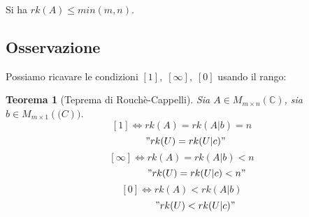 \documentclass[a4paper]{article}
\newtheorem{theorem}{Teorema}
\theoremstyle{break}
\theoremstyle{break}
\theoremstyle{break}
\theoremstyle{break}
\begin{document}
\noindent Si ha \( rk(A) \le min(m,n) \).

\subsection{Osservazione}
Possiamo ricavare le condizioni \( [1],\;[\infty],\;[0] \) usando il rango:

\begin{theorem}[Teprema di Rouchè-Cappelli]
	Sia \( A \in M_{m \times n}(\mathbb{C}) \), sia \( b \in M_{m \times 1}(\mathbb(C)) \).
	\[
		[1] \Leftrightarrow rk(A) = rk(A|b) = n
	\]
	\[
		\hspace{0.3cm} "rk(U) = rk(U|c)"
	\]
	\vspace{0.05cm}
	\[
		[\infty] \Leftrightarrow rk(A) = rk(A|b) < n
	\]
	\[
		\hspace{1.1cm} "rk(U) = rk(U|c) < n"
	\]
	\vspace{0.05cm}
	\[
		[0] \Leftrightarrow rk(A) < rk(A|b)
	\]
	\[
		\hspace{1cm} "rk(U) < rk(U|c)"
	\]
\end{theorem}
\end{document}
